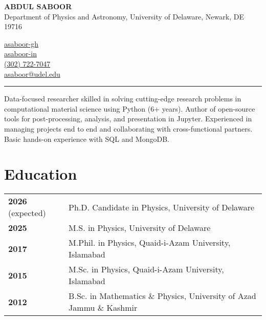\documentclass[letter,11pt]{article}
\begin{document}
\begin{minipage}{0.5\textwidth}
    \raggedright
    {\Large \textbf{ABDUL SABOOR}} \\
    Department of Physics and Astronomy, University of Delaware, Newark, DE 19716
\end{minipage}
\hfill
\begin{minipage}{0.3\textwidth}
    \raggedright
    \faGithub \quad \href{https://github.com/asaboor-gh}{asaboor-gh} \\
    \faLinkedin \quad \href{https://linkedin.com/in/asaboor-in}{asaboor-in} \\
    \faPhone \quad \href{tel:+13027227047}{(302) 722-7047} \\
    \faEnvelope \quad \href{mailto:asaboor@udel.edu}{asaboor@udel.edu}
\end{minipage}
\vspace{2mm}
\hrule
\vspace{5mm}

\noindent Data-focused researcher skilled in solving cutting-edge research problems in computational material science using Python (6+ years). Author of open-source tools for post-processing, analysis, and presentation in Jupyter. Experienced in managing projects end to end and collaborating with cross-functional partners. Basic hands-on experience with SQL and MongoDB.

\section{Education}
\begin{tabular}{p{3cm} p{12cm}}
    \textbf{2026} (expected) & Ph.D. Candidate in Physics, University of Delaware \\
    \textbf{2025} & M.S. in Physics, University of Delaware \\
    \textbf{2017} & M.Phil. in Physics, Quaid-i-Azam University, Islamabad \\
    \textbf{2015} & M.Sc. in Physics, Quaid-i-Azam University, Islamabad \\
    \textbf{2012} & B.Sc. in Mathematics \& Physics, University of Azad Jammu \& Kashmir \\
\end{tabular}
\end{document}
